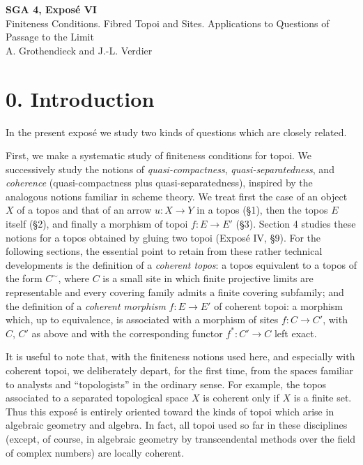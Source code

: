 \documentclass[11pt]{article}
\begin{document}

\begin{center}
{\Large \textbf{SGA 4, Expos\'e VI}}\\[0.35em]
{\large Finiteness Conditions. Fibred Topoi and Sites. Applications to Questions of Passage to the Limit}\\[0.25em]
{\normalsize A. Grothendieck and J.-L. Verdier}
\end{center}

\bigskip

\section*{0. Introduction}

In the present expos\'e we study two kinds of questions which are closely related.

First, we make a systematic study of finiteness conditions for topoi. We successively study the notions of \emph{quasi-compactness}, \emph{quasi-separatedness}, and \emph{coherence} (quasi-compactness plus quasi-separatedness), inspired by the analogous notions familiar in scheme theory. We treat first the case of an object \(X\) of a topos and that of an arrow \(u:X\to Y\) in a topos (\S1), then the topos \(E\) itself (\S2), and finally a morphism of topoi \(f:E\to E'\) (\S3). Section 4 studies these notions for a topos obtained by gluing two topoi (Expos\'e IV, \S9). For the following sections, the essential point to retain from these rather technical developments is the definition of a \emph{coherent topos}: a topos equivalent to a topos of the form \(C^\sim\), where \(C\) is a small site in which finite projective limits are representable and every covering family admits a finite covering subfamily; and the definition of a \emph{coherent morphism} \(f:E\to E'\) of coherent topoi: a morphism which, up to equivalence, is associated with a morphism of sites \(f:C\to C'\), with \(C\), \(C'\) as above and with the corresponding functor \(f^*:C'\to C\) left exact.

It is useful to note that, with the finiteness notions used here, and especially with coherent topoi, we deliberately depart, for the first time, from the spaces familiar to analysts and ``topologists'' in the ordinary sense. For example, the topos associated to a separated topological space \(X\) is coherent only if \(X\) is a finite set. Thus this expos\'e is entirely oriented toward the kinds of topoi which arise in algebraic geometry and algebra. In fact, all topoi used so far in these disciplines (except, of course, in algebraic geometry by transcendental methods over the field of complex numbers) are locally coherent.
\end{document}
